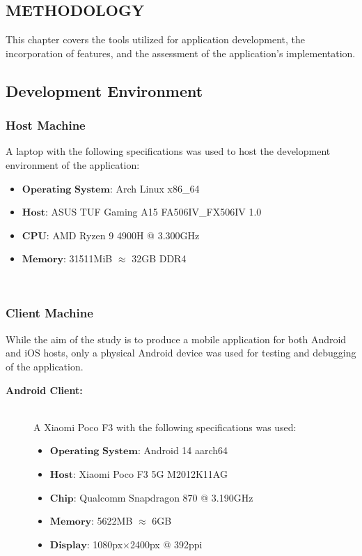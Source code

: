 \documentclass{icsthesis}
\begin{document}
\begin{mainmatter}
				
		
		\section{METHODOLOGY}
		This chapter covers the tools utilized for application development, the incorporation of features, and the assessment of the application's implementation.

		\subsection{Development Environment}
		\subsubsection{\textbf{Host Machine}}
		A laptop with the following specifications was used to host the development environment of the application:
		
		\begin{itemize}
			\item $\textbf{Operating System:}$  Arch Linux x86\_64
			\item $\textbf{Host:}$ ASUS TUF Gaming A15 FA506IV\_FX506IV 1.0
			\item $\textbf{CPU:}$ AMD Ryzen 9 4900H @ 3.300GHz
			\item $\textbf{Memory:}$ 31511MiB $\approx$ 32GB DDR4
		\end{itemize} \hfill \
		
		\subsubsection{\textbf{Client Machine}}
		While the aim of the study is to produce a mobile application for both Android and iOS hosts, only a physical Android device was used for testing and debugging of the application. 
		\begin{description}
			\item[\textbf{Android Client:}] \hfill \\
				A Xiaomi Poco F3 with the following specifications was used:
				\begin{itemize}
					\item $\textbf{Operating System:}$ Android 14 aarch64
					\item $\textbf{Host:}$ Xiaomi Poco F3 5G M2012K11AG
					\item $\textbf{Chip:}$ Qualcomm Snapdragon 870 @ 3.190GHz 
					\item $\textbf{Memory:}$ 5622MB $\approx$ 6GB
					\item $\textbf{Display:}$ 1080px$\times$2400px @ 392ppi 
				\end{itemize}
		

\end{description}
\end{mainmatter}
\end{document}
